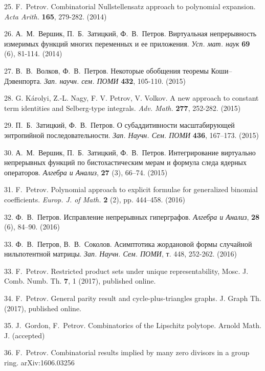 \documentclass[12pt,russian]{article}
\begin{document}
25. F.~Petrov. Combinatorial Nullstellensatz approach to polynomial expansion. {\it Acta Arith.} {\bf 165}, 279-282. (2014)

26. А.~М.~Вершик, П.~Б.~Затицкий, Ф.~В.~Петров.
Виртуальная непрерывность измеримых функций многих переменных и ее приложения. {\it Усп. мат. наук} {\bf 69} (6), 81-114. (2014)

27. В.~В.~Волков, Ф.~В.~Петров. Некоторые обобщения теоремы Коши--Дэвенпорта. {\it Зап. научн. сем. ПОМИ} \textbf{432}, 105-110. (2015)

28. G. K\'arolyi, Z.-L. Nagy, F. V. Petrov, V. Volkov. 
A new approach to constant term identities and Selberg-type integrals. {\it Adv. Math.} \textbf{277}, 252-282. (2015)

29. П.~Б.~Затицкий, Ф.~В.~Петров. О субаддитивности масштабирующей энтропийной последовательности. 
{\it Зап. Научн. Сем. ПОМИ} {\bf 436}, 167--173. (2015)


30. А.~М.~Вершик, П.~Б.~Затицкий, Ф.~В.~Петров.
Интегрирование виртуально непрерывных функций по бистохастическим мерам и формула следа ядерных операторов.
{\it Алгебра и Анализ}, \textbf{27} (3), 66--74. (2015)



31. F.~Petrov. Polynomial approach to explicit formulae for generalized binomial coefficients.
{\it Europ. J. of Math.} {\bf 2} (2), pp. 444--458. (2016)



32. Ф.~В.~Петров.  Исправление непрерывных гиперграфов. 
{\it Алгебра и Анализ}, \textbf{28} (6), 84--90. (2016)



33. Ф.~В.~Петров, В.~В.~Соколов. 
Асимптотика жордановой формы случайной нильпотентной матрицы.
{\it Зап. Научн. Сем. ПОМИ}, т. 448, 252-262. (2016)




33. F.~Petrov. Restricted product sets under unique representability, Mosc. J. Comb. Numb. Th.
 \textbf{7}, 1 (2017), published online.

34. F.~Petrov. General parity result and cycle-plus-triangles graphs. J. Graph Th. (2017), published online.

35. J.~Gordon, F.~Petrov. Combinatorics of the Lipschitz polytope. Arnold Math. J. (accepted)

36. F.~Petrov. Combinatorial results implied by many zero divisors in a group ring.
arXiv:1606.03256
\end{document}
